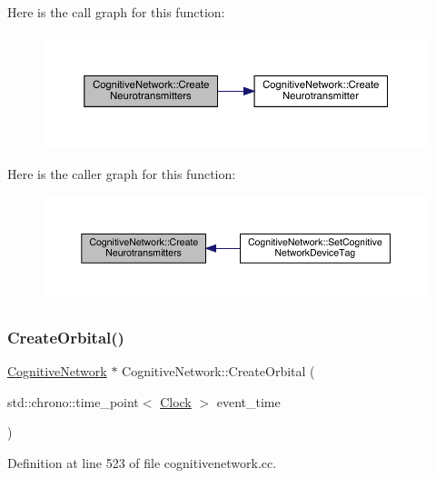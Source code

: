 Here is the call graph for this function\+:
\nopagebreak
\begin{figure}[H]
\begin{center}
\leavevmode
\includegraphics[width=350pt]{class_cognitive_network_ad877c495c9efdb582613a5af8d854ac3_cgraph}
\end{center}
\end{figure}
Here is the caller graph for this function\+:
\nopagebreak
\begin{figure}[H]
\begin{center}
\leavevmode
\includegraphics[width=350pt]{class_cognitive_network_ad877c495c9efdb582613a5af8d854ac3_icgraph}
\end{center}
\end{figure}
\mbox{\label{class_cognitive_network_a5e0a782afc45d75d57fef91dd5513546}} 
\subsubsection{\texorpdfstring{Create\+Orbital()}{CreateOrbital()}}
{\footnotesize\ttfamily \hyperlink{class_cognitive_network}{Cognitive\+Network} $\ast$ Cognitive\+Network\+::\+Create\+Orbital (\begin{DoxyParamCaption}\item[{std\+::chrono\+::time\+\_\+point$<$ \hyperlink{universe_8h_a0ef8d951d1ca5ab3cfaf7ab4c7a6fd80}{Clock} $>$}]{event\+\_\+time }\end{DoxyParamCaption})}



Definition at line 523 of file cognitivenetwork.\+cc.


